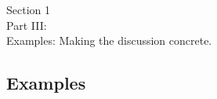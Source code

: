 \documentclass[aspectratio=169,xcolor=dvipsnames,10pt]{beamer}
\newcommand{\CVaR}{\textup{CVaR}}
\newcommand{\bbp}{\mathbb{P}}
\newcommand{\cF}{\mathcal{F}}
\begin{document}

\begin{frame}\frametitle{}
\begin{center}\Large
Section 1\\
Part III:\\
Examples: Making the discussion concrete.
\end{center}
\end{frame}

\subsection{Examples}
\end{document}
